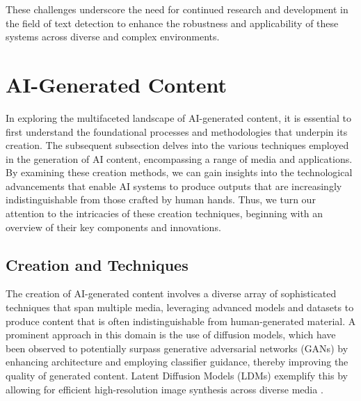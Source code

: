 These challenges underscore the need for continued research and development in the field of text detection to enhance the robustness and applicability of these systems across diverse and complex environments.











\section{AI-Generated Content} \label{sec:AI-Generated Content}

In exploring the multifaceted landscape of AI-generated content, it is essential to first understand the foundational processes and methodologies that underpin its creation. The subsequent subsection delves into the various techniques employed in the generation of AI content, encompassing a range of media and applications. By examining these creation methods, we can gain insights into the technological advancements that enable AI systems to produce outputs that are increasingly indistinguishable from those crafted by human hands. Thus, we turn our attention to the intricacies of these creation techniques, beginning with an overview of their key components and innovations. 





\subsection{Creation and Techniques} \label{subsec:Creation and Techniques}



The creation of AI-generated content involves a diverse array of sophisticated techniques that span multiple media, leveraging advanced models and datasets to produce content that is often indistinguishable from human-generated material. A prominent approach in this domain is the use of diffusion models, which have been observed to potentially surpass generative adversarial networks (GANs) by enhancing architecture and employing classifier guidance, thereby improving the quality of generated content. Latent Diffusion Models (LDMs) exemplify this by allowing for efficient high-resolution image synthesis across diverse media \cite{yamshchikov2020styletransferparaphraselookingsensible}.



